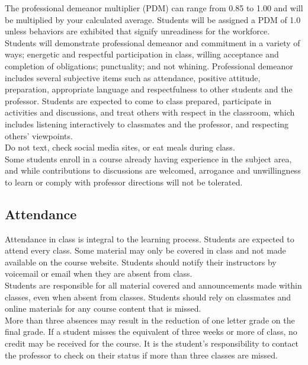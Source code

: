 \documentclass[a4paper,11pt,twocolumn]{article}
\begin{document}
\noindent The professional demeanor multiplier (PDM) can range from 0.85 to 1.00 and will be multiplied by your calculated average. Students will be assigned a PDM of 1.0 unless behaviors are exhibited that signify unreadiness for the workforce.\\

\noindent Students will demonstrate professional demeanor and commitment in a variety of ways; energetic and respectful participation in class, willing acceptance and completion of obligations; punctuality; and not whining. Professional demeanor includes several subjective items such as attendance, positive attitude, preparation, appropriate language and respectfulness to other students and the professor. Students are expected to come to class prepared, participate in activities and discussions, and treat others with respect in the classroom, which includes listening interactively to classmates and the professor, and respecting others' viewpoints.\\

\noindent Do not text, check social media sites, or eat meals during class.\\

\noindent Some students enroll in a course already having experience in the subject area, and while contributions to discussions are welcomed, arrogance and unwillingness to learn or comply with professor directions will not be tolerated.

\subsection*{Attendance}
Attendance in class is integral to the learning process. Students are expected to attend every class. Some material may only be covered in class and not made available on the course website. Students should notify their instructors by voicemail or email when they are absent from class.\\

\noindent Students are responsible for all material covered and announcements made within classes, even when absent from classes. Students should rely on classmates and online materials for any course content that is missed.\\

\noindent More than three absences may result in the reduction of one letter grade on the final grade. If a student misses the equivalent of three weeks or more of class, no credit may be received for the course. It is the student's responsibility to contact the professor to check on their status if more than three classes are missed.\\
\end{document}
